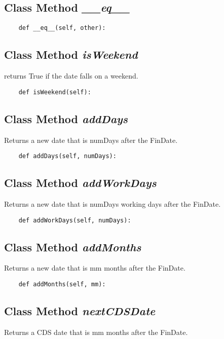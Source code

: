 \documentclass[twoside,11pt]{book}
\begin{document}
\subsection{Class Method {\it \_\_eq\_\_}}


\begin{lstlisting}
    def __eq__(self, other):
\end{lstlisting}

\subsection{Class Method {\it isWeekend}}
returns True if the date falls on a weekend. 

\begin{lstlisting}
    def isWeekend(self):
\end{lstlisting}

\subsection{Class Method {\it addDays}}
Returns a new date that is numDays after the FinDate. 

\begin{lstlisting}
    def addDays(self, numDays):
\end{lstlisting}

\subsection{Class Method {\it addWorkDays}}
Returns a new date that is numDays working days after the FinDate. 

\begin{lstlisting}
    def addWorkDays(self, numDays):
\end{lstlisting}

\subsection{Class Method {\it addMonths}}
Returns a new date that is mm months after the FinDate. 

\begin{lstlisting}
    def addMonths(self, mm):
\end{lstlisting}

\subsection{Class Method {\it nextCDSDate}}
Returns a CDS date that is mm months after the FinDate. 
\end{document}

